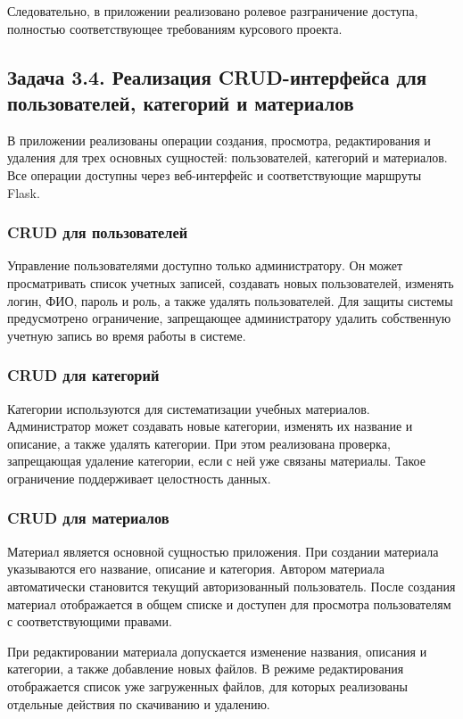 \documentclass[14pt,a4paper]{extarticle}
\begin{document}
Следовательно, в приложении реализовано ролевое разграничение доступа, полностью соответствующее требованиям курсового проекта.

\subsection{Задача 3.4. Реализация CRUD-интерфейса для пользователей, категорий и материалов}

В приложении реализованы операции создания, просмотра, редактирования и удаления для трех основных сущностей: пользователей, категорий и материалов. Все операции доступны через веб-интерфейс и соответствующие маршруты Flask.

\subsubsection*{CRUD для пользователей}

Управление пользователями доступно только администратору. Он может просматривать список учетных записей, создавать новых пользователей, изменять логин, ФИО, пароль и роль, а также удалять пользователей. Для защиты системы предусмотрено ограничение, запрещающее администратору удалить собственную учетную запись во время работы в системе.

\subsubsection*{CRUD для категорий}

Категории используются для систематизации учебных материалов. Администратор может создавать новые категории, изменять их название и описание, а также удалять категории. При этом реализована проверка, запрещающая удаление категории, если с ней уже связаны материалы. Такое ограничение поддерживает целостность данных.

\subsubsection*{CRUD для материалов}

Материал является основной сущностью приложения. При создании материала указываются его название, описание и категория. Автором материала автоматически становится текущий авторизованный пользователь. После создания материал отображается в общем списке и доступен для просмотра пользователям с соответствующими правами.

При редактировании материала допускается изменение названия, описания и категории, а также добавление новых файлов. В режиме редактирования отображается список уже загруженных файлов, для которых реализованы отдельные действия по скачиванию и удалению.
\end{document}
